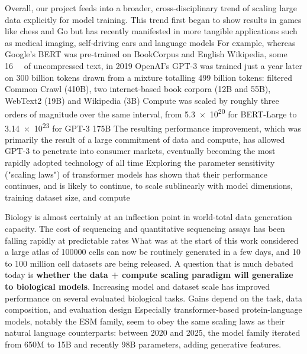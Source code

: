 Overall, our project feeds into a broader, cross-disciplinary trend of scaling large data explicitly for model training. This trend first began to show results in games like chess and Go but has recently manifested in more tangible applications such as medical imaging, self-driving cars and language models For example, whereas Google's BERT was pre-trained on BookCorpus and English Wikipedia, some \SI{16}{\giga\byte} of uncompressed text, in 2019 OpenAI's GPT-3 was trained just a year later on \num{300} billion tokens drawn from a mixture totalling \num{499} billion tokens: filtered Common Crawl (410B), two internet-based book corpora (12B and 55B), WebText2 (19B) and Wikipedia (3B) Compute was scaled by roughly three orders of magnitude over the same interval, from \SI{5.3e20}{\flops} for BERT-Large to \SI{3.14e23}{\flops} for GPT-3 175B The resulting performance improvement, which was primarily the result of a large commitment of data and compute, has allowed GPT-3 to penetrate into consumer markets, eventually becoming the most rapidly adopted technology of all time Exploring the parameter sensitivity ("scaling laws") of transformer models has shown that their performance continues, and is likely to continue, to scale sublinearly with model dimensions, training dataset size, and compute

Biology is almost certainly at an inflection point in world-total data generation capacity. The cost of sequencing and quantitative sequencing assays has been falling rapidly at predictable rates What was at the start of this work considered a large atlas of \num{100000} cells can now be routinely generated in a few days, and 10 to 100 million cell datasets are being released. A question that is much debated today is \textbf{whether the data + compute scaling paradigm will generalize to biological models}. Increasing model and dataset scale has improved performance on several evaluated biological tasks. Gains depend on the task, data composition, and evaluation design Especially transformer-based protein-language models, notably the ESM family, seem to obey the same scaling laws as their natural language counterparts: between 2020 and 2025, the model family iterated from 650M to 15B and recently 98B parameters, adding generative features.

